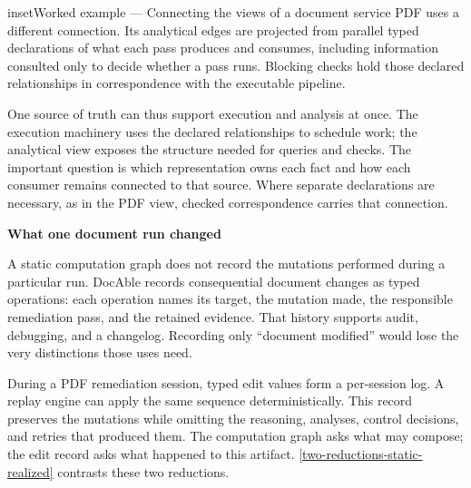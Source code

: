 \begin{bookbox}{inset}{Worked example --- Connecting the views of a document service}
PDF uses a different connection. Its analytical edges are projected from parallel typed declarations of what each pass produces and consumes, including information consulted only to decide whether a pass runs. Blocking checks hold those declared relationships in correspondence with the executable pipeline.


One source of truth can thus support execution and analysis at once. The execution machinery uses the declared relationships to schedule work; the analytical view exposes the structure needed for queries and checks. The important question is which representation owns each fact and how each consumer remains connected to that source. Where separate declarations are necessary, as in the PDF view, checked correspondence carries that connection.

\textbf{What one document run changed}


A static computation graph does not record the mutations performed during a particular run. DocAble records consequential document changes as typed operations: each operation names its target, the mutation made, the responsible remediation pass, and the retained evidence. That history supports audit, debugging, and a changelog. Recording only ``document modified'' would lose the very distinctions those uses need.


During a PDF remediation session, typed edit values form a per-session log. A replay engine can apply the same sequence deterministically. This record preserves the mutations while omitting the reasoning, analyses, control decisions, and retries that produced them. The computation graph asks what may compose; the edit record asks what happened to this artifact. \autoref{two-reductions-static-realized} contrasts these two reductions.


\end{bookbox}

